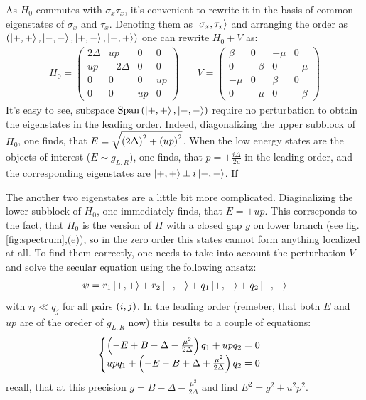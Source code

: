 As $ H_0 $ commutes with $ \sigma_x\tau_x $, it's convenient to rewrite it in the basis of common eigenstates of $ \sigma_x $ and $ \tau_x $. Denoting them as $ \ket{\sigma_x, \tau_x }$ and arranging the order as $  \left(\ket{+, + },\ket{-, - },\ket{+, - },\ket{-, + }\right) $ one can rewrite $ H_0+V $ as:
\begin{gather}
	H_0
	=
	\begin{pmatrix}
	2\Delta & up & 0 & 0 \\
	up & -2\Delta & 0 & 0\\
	0 & 0 & 0 & up \\
	0 & 0 & up & 0 
	\end{pmatrix}
	~~~~~~~~
	V
	=
		\begin{pmatrix}
	\beta & 0 & -\mu & 0 \\
	0 & -\beta & 0 & -\mu\\
	-\mu & 0 & \beta & 0 \\
	0 & -\mu & 0 & -\beta 
	\end{pmatrix}
\end{gather}
It's easy to see, subspace $ \mathrm{Span}\left(\ket{+, + },\ket{-, - }\right) $ require no perturbation to obtain the eigenstates in the leading order. Indeed, diagonalizing the upper subblock of $ H_0 $, one finds, that $ E=\sqrt{\left(2\Delta\right)^2+\left(up\right)^2} $. When the low energy states are the objects of interest ($ E\sim g_{L,R} $), one finds, that $ p =\pm\frac{i\Delta}{2u} $ in the leading order, and the corresponding eigenstates are $\ket{+, + }\pm i\ket{-, - } $. If

The another two eigenstates are a little bit more complicated. Diaginalizing  the lower subblock of $ H_0 $, one immediately finds, that $ E=\pm up $. This corrseponds to the fact, that $ H_0 $ is the version of $ H $ with a closed gap $ g $  on lower branch (see fig. \ref{fig:spectrum},(e)), so in the zero order this states cannot form anything localized at all. To find them correctly, one needs to take into account the perturbation $ V $ and solve the secular equation using the following ansatz:
\begin{gather}
	\psi = r_1\ket{+, + }+r_2\ket{-, - }+q_{1}\ket{+, - }+q_{2}\ket{-, + }
\end{gather}
with $ r_i\ll q_j $ for all  pairs $ \left(i,j\right) $. In the leading order (remeber, that both $ E  $ and $ up $ are of the oreder of $ g_{L,R} $ now) this results to a couple of equations:
\begin{gather}
\begin{cases}
	\left(-E+B-\Delta-\frac{\mu^2}{2\Delta}\right)q_1+up q_2=0
	\\
	u p q_1 + \left(-E-B+\Delta+\frac{\mu^2}{2\Delta}\right)q_2 =0
\end{cases}
\end{gather}
recall, that at this precision $ g=B-\Delta-\frac{\mu^2}{2\Delta} $ and find $ E^2=g^2+u^2p^2 $.

